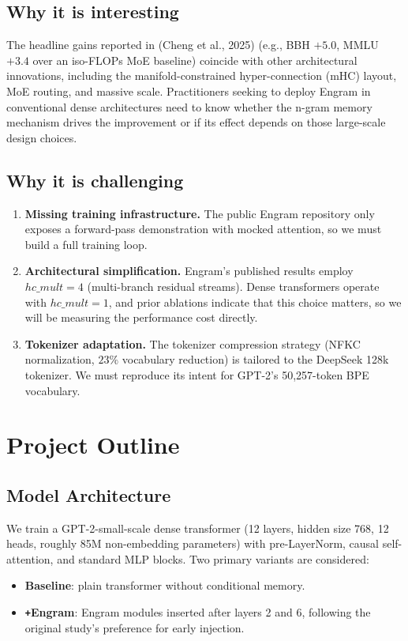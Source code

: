 \documentclass[11pt]{article}
\begin{document}
\subsection{Why it is interesting}
The headline gains reported in (Cheng et al., 2025) (e.g., BBH $+5.0$, MMLU $+3.4$ over an iso-FLOPs MoE baseline) coincide with other architectural innovations, including the manifold-constrained hyper-connection (mHC) layout, MoE routing, and massive scale. Practitioners seeking to deploy Engram in conventional dense architectures need to know whether the n-gram memory mechanism drives the improvement or if its effect depends on those large-scale design choices.

\subsection{Why it is challenging}
\begin{enumerate}
    \item \textbf{Missing training infrastructure.} The public Engram repository only exposes a forward-pass demonstration with mocked attention, so we must build a full training loop.
    \item \textbf{Architectural simplification.} Engram's published results employ $hc\_mult = 4$ (multi-branch residual streams). Dense transformers operate with $hc\_mult = 1$, and prior ablations indicate that this choice matters, so we will be measuring the performance cost directly.
    \item \textbf{Tokenizer adaptation.} The tokenizer compression strategy (NFKC normalization, $23\%$ vocabulary reduction) is tailored to the DeepSeek 128k tokenizer. We must reproduce its intent for GPT-2's 50{,}257-token BPE vocabulary.
\end{enumerate}

\section{Project Outline}
\subsection{Model Architecture}
We train a GPT-2-small-scale dense transformer (12 layers, hidden size 768, 12 heads, roughly 85M non-embedding parameters) with pre-LayerNorm, causal self-attention, and standard MLP blocks. Two primary variants are considered:
\begin{itemize}
    \item \textbf{Baseline}: plain transformer without conditional memory.
    \item \textbf{\texttt{+}Engram}: Engram modules inserted after layers 2 and 6, following the original study's preference for early injection.
\end{itemize}
\end{document}
